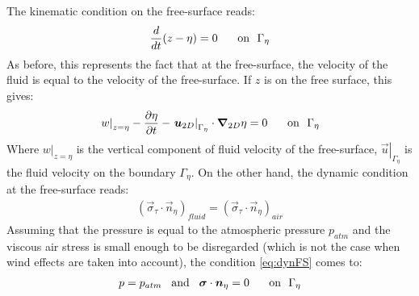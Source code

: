 The kinematic condition on the free-surface reads:
\begin{align}
  \dfrac{d}{dt}(z-\eta)=0 \hspace{0.5cm}\text{ on ~}\Gamma_\eta
\end{align}
As before, this represents the fact that at the free-surface, the velocity of the fluid is equal to the velocity of the free-surface.
If $z$ is on the free surface, this gives:
\begin{align}
  \left.w\right\rvert_{z=\eta} - \dfrac{\partial\eta}{\partial t} - \left.\vec{u}_{2D}\right\rvert_{\Gamma_\eta}\cdot\Grad_{2D}\eta = 0 \hspace{0.5cm}\text{ on ~}\Gamma_\eta
  \label{eq:FreeSurfaceBoundary}
\end{align}
Where $\left.w\right\rvert_{z=\eta}$ is the vertical component of fluid velocity of the free-surface,
$\left.\vec{u}\right\rvert_{\Gamma_\eta}$ is the fluid velocity on the boundary $\Gamma_\eta$.
On the other hand, the dynamic condition at the free-surface reads:
\begin{align}
  (\vec{\sigma}_\tau \cdot\vec{n}_\eta)_{fluid} = (\vec{\sigma}_\tau \cdot\vec{n}_\eta)_{air}
  \label{eq:dynFS}
\end{align}
Assuming that the pressure is equal to the atmospheric pressure $p_{atm}$ and the viscous air
stress is small enough to be disregarded (which is not the case when wind effects are taken into account),
the condition \eqref{eq:dynFS} comes to:
\begin{align}
  p = p_{atm} \hspace{0.3cm}\text{and}\hspace{0.3cm} \vec{\sigma}\cdot\vec{n}_\eta = 0 \hspace{0.5cm}\text{ on ~}\Gamma_\eta
\end{align}

